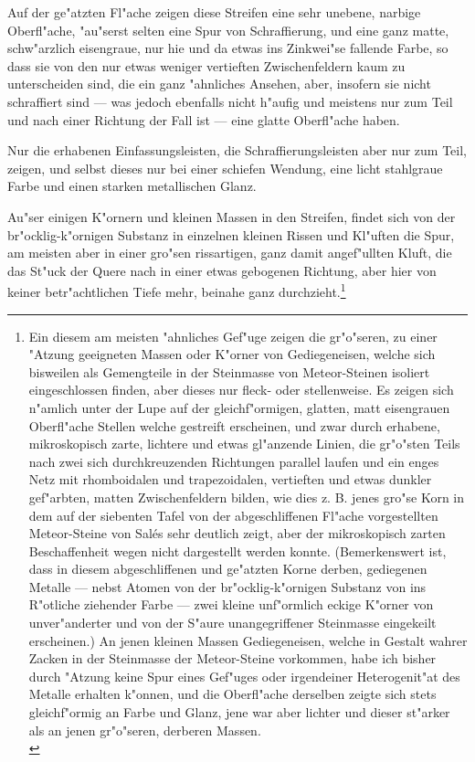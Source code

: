 \documentclass[a4paper, 11pt, oneside, german]{article}
\begin{document}
Auf der ge"atzten Fl"ache zeigen diese Streifen eine sehr unebene, narbige Oberfl"ache, "au"serst selten eine Spur von Schraffierung, und eine ganz matte, schw"arzlich eisengraue, nur hie und da etwas ins Zinkwei"se fallende Farbe, so dass sie von den nur etwas weniger vertieften Zwischenfeldern kaum zu unterscheiden sind, die ein ganz "ahnliches Ansehen, aber, insofern sie nicht schraffiert sind --- was jedoch ebenfalls nicht h"aufig und meistens nur zum Teil und nach einer Richtung der Fall ist --- eine glatte Oberfl"ache haben.

Nur die erhabenen Einfassungsleisten, die Schraffierungsleisten aber nur zum Teil, zeigen, und selbst dieses nur bei einer schiefen Wendung, eine licht stahlgraue Farbe und einen starken metallischen Glanz.

Au"ser einigen K"ornern und kleinen Massen in den Streifen, findet sich von der br"ocklig-k"ornigen Substanz in einzelnen kleinen Rissen und Kl"uften die Spur, am meisten aber in einer gro"sen rissartigen, ganz damit angef"ullten Kluft, die das St"uck der Quere nach in einer etwas gebogenen Richtung, aber hier von keiner betr"achtlichen Tiefe mehr, beinahe ganz durchzieht.\footnote{Ein diesem am meisten "ahnliches Gef"uge zeigen die gr"o"seren, zu einer "Atzung geeigneten Massen oder K"orner von Gediegeneisen, welche sich bisweilen als Gemengteile in der Steinmasse von Meteor-Steinen isoliert eingeschlossen finden, aber dieses nur fleck- oder stellenweise. Es zeigen sich n"amlich unter der Lupe auf der gleichf"ormigen, glatten, matt eisengrauen Oberfl"ache Stellen welche gestreift erscheinen, und zwar durch erhabene, mikroskopisch zarte, lichtere und etwas gl"anzende Linien, die gr"o"sten Teils nach zwei sich durchkreuzenden Richtungen parallel laufen und ein enges Netz mit rhomboidalen und trapezoidalen, vertieften und etwas dunkler gef"arbten, matten Zwischenfeldern bilden, wie dies z. B. jenes gro"se Korn in dem auf der siebenten Tafel von der abgeschliffenen Fl"ache vorgestellten Meteor-Steine von Salés sehr deutlich zeigt, aber der mikroskopisch zarten Beschaffenheit wegen nicht dargestellt werden konnte. (Bemerkenswert ist, dass in diesem abgeschliffenen und ge"atzten Korne derben, gediegenen Metalle --- nebst Atomen von der br"ocklig-k"ornigen Substanz von ins R"otliche ziehender Farbe --- zwei kleine unf"ormlich eckige K"orner von unver"anderter und von der S"aure unangegriffener Steinmasse eingekeilt erscheinen.) An jenen kleinen Massen Gediegeneisen, welche in Gestalt wahrer Zacken in der Steinmasse der Meteor-Steine vorkommen, habe ich bisher durch "Atzung keine Spur eines Gef"uges oder irgendeiner Heterogenit"at des Metalle erhalten k"onnen, und die Oberfl"ache derselben zeigte sich stets gleichf"ormig an Farbe und Glanz, jene war aber lichter und dieser st"arker als an jenen gr"o"seren, derberen Massen.\\
}
\end{document}
